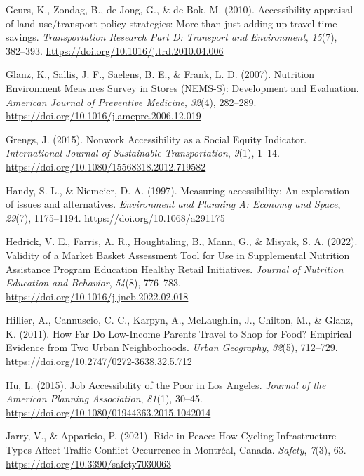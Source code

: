 \documentclass[
  letterpaper,
  authoryear,
  review,
  3p]{elsarticle}
\newlength{\cslhangindent}
\newlength{\cslentryspacingunit} %
\newenvironment{CSLReferences}[2] %
 {%
  \setlength{\parindent}{0pt}
  \ifodd #1
  \let\oldpar\par
  \def\par{\hangindent=\cslhangindent\oldpar}
  \fi
  \setlength{\parskip}{#2\cslentryspacingunit}
 }%
 {}
\begin{document}
\begin{CSLReferences}{1}{0}
\leavevmode{}%
Geurs, K., Zondag, B., de Jong, G., \& de Bok, M. (2010). Accessibility
appraisal of land-use/transport policy strategies: {More} than just
adding up travel-time savings. \emph{Transportation Research Part D:
Transport and Environment}, \emph{15}(7), 382--393.
\url{https://doi.org/10.1016/j.trd.2010.04.006}

\leavevmode{}%
Glanz, K., Sallis, J. F., Saelens, B. E., \& Frank, L. D. (2007).
Nutrition {Environment Measures Survey} in {Stores} ({NEMS-S}):
{Development} and {Evaluation}. \emph{American Journal of Preventive
Medicine}, \emph{32}(4), 282--289.
\url{https://doi.org/10.1016/j.amepre.2006.12.019}

\leavevmode{}%
Grengs, J. (2015). Nonwork {Accessibility} as a {Social Equity
Indicator}. \emph{International Journal of Sustainable Transportation},
\emph{9}(1), 1--14. \url{https://doi.org/10.1080/15568318.2012.719582}

\leavevmode{}%
Handy, S. L., \& Niemeier, D. A. (1997). Measuring accessibility: {An}
exploration of issues and alternatives. \emph{Environment and Planning
A: Economy and Space}, \emph{29}(7), 1175--1194.
\url{https://doi.org/10.1068/a291175}

\leavevmode{}%
Hedrick, V. E., Farris, A. R., Houghtaling, B., Mann, G., \& Misyak, S.
A. (2022). Validity of a {Market Basket Assessment Tool} for {Use} in
{Supplemental Nutrition Assistance Program Education Healthy Retail
Initiatives}. \emph{Journal of Nutrition Education and Behavior},
\emph{54}(8), 776--783. \url{https://doi.org/10.1016/j.jneb.2022.02.018}

\leavevmode{}%
Hillier, A., Cannuscio, C. C., Karpyn, A., McLaughlin, J., Chilton, M.,
\& Glanz, K. (2011). How {Far Do Low-Income Parents Travel} to {Shop}
for {Food}? {Empirical Evidence} from {Two Urban Neighborhoods}.
\emph{Urban Geography}, \emph{32}(5), 712--729.
\url{https://doi.org/10.2747/0272-3638.32.5.712}

\leavevmode{}%
Hu, L. (2015). Job {Accessibility} of the {Poor} in {Los Angeles}.
\emph{Journal of the American Planning Association}, \emph{81}(1),
30--45. \url{https://doi.org/10.1080/01944363.2015.1042014}

\leavevmode{}%
Jarry, V., \& Apparicio, P. (2021). Ride in {Peace}: {How Cycling
Infrastructure Types Affect Traffic Conflict Occurrence} in {Montréal},
{Canada}. \emph{Safety}, \emph{7}(3), 63.
\url{https://doi.org/10.3390/safety7030063}


\end{CSLReferences}
\end{document}
